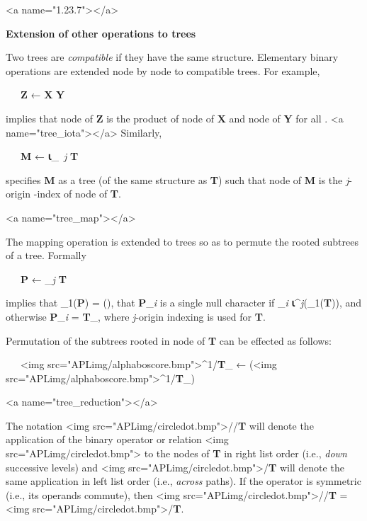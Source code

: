 {<a name="1.23.7"></a>
\par \textbf{Extension of other operations to trees}

\par Two trees are \textit{compatible} if they have the same structure. Elementary binary operations are extended node by node to compatible trees. For example,

\par \ \ \ \textbf{Z} ← \textbf{X} \times \textbf{Y}

\par implies that node  of \textbf{Z} is the product of node  of \textbf{X} and node  of \textbf{Y} for all .
<a name="tree_iota"></a> Similarly,

\par \ \ \ \textbf{M} ←  
\textbf{⍳}_{\textit{\ j}} \textbf{T}

\par specifies \textbf{M} as a tree (of the same structure as \textbf{T}) such that node  of \textbf{M} is the \textit{j}-origin -index of node  of \textbf{T}.

<a name="tree_map"></a>
\par The mapping operation is extended to trees so as to permute the rooted subtrees of a tree. Formally

\par \ \ \ \textbf{P} ←  \int_{\textit{j}} \textbf{T}

\par implies that 
\textbf{\mu}_{1}(\textbf{P}) = 
\textit{\nu}(), that \textbf{P}_{\textit{i}} is a single null character if 
_{\textit{i}} 
\notin \textbf{⍳}^{\textit{j}}(\textbf{\mu}_{1}(\textbf{T})), and otherwise 
\textbf{P}_{\textit{i}} = 
\textbf{T}_{}, where \textit{j}-origin indexing is used for \textbf{T}.

\par Permutation of the subtrees rooted in node  of \textbf{T} can be effected as follows:

\par \ \ \ 
<img src="APLimg/alphaboscore.bmp">^{1}/\textbf{T}_{} ←  \int (<img src="APLimg/alphaboscore.bmp">^{1}/\textbf{T}_{})

<a name="tree_reduction"></a>
\par The notation <img src="APLimg/circledot.bmp">//\textbf{T} will denote the application of the binary operator or relation <img src="APLimg/circledot.bmp"> to the nodes of \textbf{T} in right list order (i.e., \textit{down} successive levels) and <img src="APLimg/circledot.bmp">/\textbf{T} will denote the same application in left list order (i.e., \textit{across} paths). If the operator is symmetric (i.e., its operands commute), then 
<img src="APLimg/circledot.bmp">//\textbf{T} = 
<img src="APLimg/circledot.bmp">/\textbf{T}.

}
